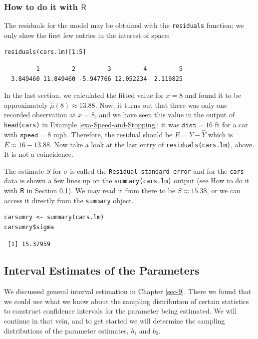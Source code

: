 \documentclass[captions=tableheading]{scrbook}
\begin{document}
\subsubsection{How to do it with \(\mathsf{R}\)}
\label{sec-11-2-3-1}


The residuals for the model may be obtained with the \texttt{residuals} function; we only show the first few entries in the interest of space:


\begin{verbatim}
residuals(cars.lm)[1:5]
\end{verbatim}

\begin{verbatim}
         1         2         3         4         5 
  3.849460 11.849460 -5.947766 12.052234  2.119825
\end{verbatim}



In the last section, we calculated the fitted value for \(x=8\) and found it to be approximately \( \hat{\mu}(8)\approx  13.88 \). Now, it turns out that there was only one recorded observation at \(x = 8\), and we have seen this value in the output of \texttt{head(cars)} in Example \ref{exa-Speed-and-Stopping}; it was \(\mathtt{dist} = 16\) ft for a car with \( \mathtt{speed} = 8 \) mph. Therefore, the residual should be \(E = Y - \hat{Y}\) which is \(E \approx 16 -  13.88 \). Now take a look at the last entry of \texttt{residuals(cars.lm)}, above. It is not a coincidence.

The estimate \(S\) for \(\sigma\) is called the \texttt{Residual standard error} and for the \texttt{cars} data is shown a few lines up on the \texttt{summary(cars.lm)} output (see How to do it with \(\mathsf{R}\) in Section \ref{sec-11-2-4}). We may read it from there to be \( S\approx  15.38 \), or we can access it directly from the \texttt{summary} object.


\begin{verbatim}
carsumry <- summary(cars.lm)
carsumry$sigma
\end{verbatim}

\begin{verbatim}
 [1] 15.37959
\end{verbatim}
\subsection{Interval Estimates of the Parameters}
\label{sec-11-2-4}
\label{sub-slr-interval-est-params}


We discussed general interval estimation in Chapter \ref{sec-9}. There we found that we could use what we know about the sampling distribution of certain statistics to construct confidence intervals for the parameter being estimated. We will continue in that vein, and to get started we will determine the sampling distributions of the parameter estimates, \(b_{1}\) and \(b_{0}\).
\end{document}
